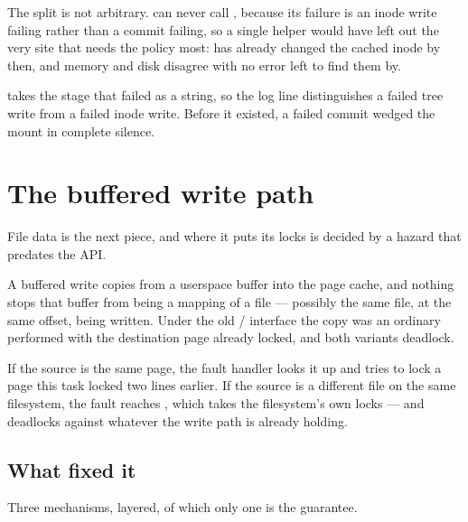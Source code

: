 The split is not arbitrary.  can never call
, because its failure is an inode write failing rather
than a commit failing, so a single helper would have left out the very site that
needs the policy most:  has already changed the cached
inode by then, and memory and disk disagree with no error left to find them by.

 takes the stage that failed as a string, so the log line
distinguishes a failed tree write from a failed inode write. Before it existed,
a failed commit wedged the mount in complete silence.


\section{The buffered write path}

File data is the next piece, and where it puts its locks is decided by a hazard
that predates the API.

A buffered write copies from a userspace buffer into the page cache, and nothing
stops that buffer from being a mapping of a file --- possibly the same file, at
the same offset, being written. Under the old  /
 interface the copy was an ordinary 
performed with the destination page already locked, and both variants deadlock.

If the source is the same page, the fault handler looks it up and tries to lock a
page this task locked two lines earlier. If the source is a different file on the
same filesystem, the fault reaches , which takes the
filesystem's own locks --- and deadlocks against whatever the write path is
already holding.

\subsection{What fixed it}

Three mechanisms, layered, of which only one is the guarantee.

